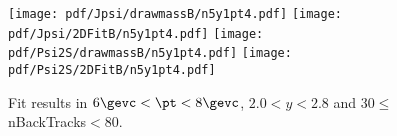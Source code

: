 \begin{figure}[H]
\begin{center}
\texttt{[image: pdf/Jpsi/drawmassB/n5y1pt4.pdf]}
\texttt{[image: pdf/Jpsi/2DFitB/n5y1pt4.pdf]}
\vspace*{-0.5cm}
\texttt{[image: pdf/Psi2S/drawmassB/n5y1pt4.pdf]}
\texttt{[image: pdf/Psi2S/2DFitB/n5y1pt4.pdf]}
\vspace*{-0.5cm}
\end{center}
\caption{Fit results in $6\gevc<\pt<8\gevc$, $2.0<y<2.8$ and 30$\leq$nBackTracks$<$80.}
\label{Fitn5y1pt4}
\end{figure}
